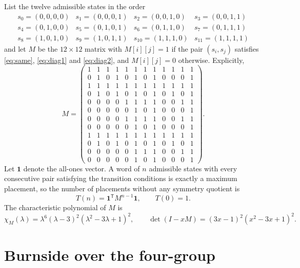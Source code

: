 \documentclass[12pt]{article}
\theoremstyle{definition}
\begin{document}
List the twelve admissible states in the order
\[
\begin{array}{llll}
s_0 = (0,0,0,0) & s_1 = (0,0,0,1) & s_2 = (0,0,1,0) & s_3 = (0,0,1,1) \\
s_4 = (0,1,0,0) & s_5 = (0,1,0,1) & s_6 = (0,1,1,0) & s_7 = (0,1,1,1) \\
s_8 = (1,0,1,0) & s_9 = (1,0,1,1) & s_{10} = (1,1,1,0) & s_{11} = (1,1,1,1)
\end{array}
\]
and let $M$ be the $12 \times 12$ matrix with $M[i][j] = 1$ if the pair
$(s_i, s_j)$ satisfies \eqref{eq:same}, \eqref{eq:diag1} and \eqref{eq:diag2},
and $M[i][j] = 0$ otherwise. Explicitly,
\[
M = \begin{pmatrix}
1&1&1&1&1&1&1&1&1&1&1&1\\
0&1&0&1&0&1&0&1&0&0&0&1\\
1&1&1&1&1&1&1&1&1&1&1&1\\
0&1&0&1&0&1&0&1&0&1&0&1\\
0&0&0&0&1&1&1&1&0&0&1&1\\
0&0&0&0&0&1&0&1&0&0&0&1\\
0&0&0&0&1&1&1&1&0&0&1&1\\
0&0&0&0&0&1&0&1&0&0&0&1\\
1&1&1&1&1&1&1&1&1&1&1&1\\
0&1&0&1&0&1&0&1&0&1&0&1\\
0&0&0&0&0&1&1&1&0&0&1&1\\
0&0&0&0&0&1&0&1&0&0&0&1
\end{pmatrix}.
\]
Let $\mathbf{1}$ denote the all-ones vector. A word of $n$ admissible states
with every consecutive pair satisfying the transition conditions is exactly a
maximum placement, so the number of placements without any symmetry quotient is
\begin{equation}
\label{eq:T}
T(n) = \mathbf{1}^{\mathsf{T}} M^{n-1} \mathbf{1},
\qquad T(0) = 1.
\end{equation}
The characteristic polynomial of $M$ is
\begin{equation}
\label{eq:charpoly}
\chi_M(\lambda) = \lambda^6 (\lambda - 3)^2 (\lambda^2 - 3\lambda + 1)^2,
\qquad
\det(I - xM) = (3x-1)^2 (x^2 - 3x + 1)^2 .
\end{equation}

\section{Burnside over the four-group}
\end{document}
